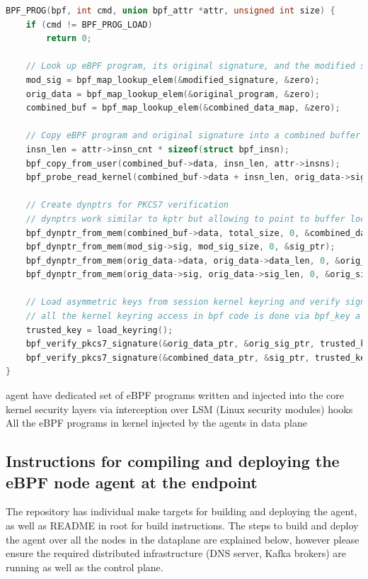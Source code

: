 \documentclass [11pt, proquest] {uwthesis}[2020/02/24]
\begin{document}
\begin{lstlisting}[language=C, caption={Kernel BPF LSM Hook for PKCS7 Signature Verification}, label={lst:bpf-lsm}]
BPF_PROG(bpf, int cmd, union bpf_attr *attr, unsigned int size) {
    if (cmd != BPF_PROG_LOAD)
        return 0;

    // Look up eBPF program, its original signature, and the modified signature
    mod_sig = bpf_map_lookup_elem(&modified_signature, &zero);
    orig_data = bpf_map_lookup_elem(&original_program, &zero);
    combined_buf = bpf_map_lookup_elem(&combined_data_map, &zero);

    // Copy eBPF program and original signature into a combined buffer
    insn_len = attr->insn_cnt * sizeof(struct bpf_insn);
    bpf_copy_from_user(combined_buf->data, insn_len, attr->insns);
    bpf_probe_read_kernel(combined_buf->data + insn_len, orig_data->sig_len, orig_data->sig);

    // Create dynptrs for PKCS7 verification
    // dynptrs work similar to kptr but allowing to point to buffer location storing large amount of data as in case of signature for eBPF verifier requirements. 
    bpf_dynptr_from_mem(combined_buf->data, total_size, 0, &combined_data_ptr);
    bpf_dynptr_from_mem(mod_sig->sig, mod_sig_size, 0, &sig_ptr);
    bpf_dynptr_from_mem(orig_data->data, orig_data->data_len, 0, &orig_data_ptr);
    bpf_dynptr_from_mem(orig_data->sig, orig_data->sig_len, 0, &orig_sig_ptr);

    // Load asymmetric keys from session kernel keyring and verify signatures
    // all the kernel keyring access in bpf code is done via bpf_key a wrapper over kernel core key structure accessed from userspace via keyctl
    trusted_key = load_keyring();
    bpf_verify_pkcs7_signature(&orig_data_ptr, &orig_sig_ptr, trusted_key);
    bpf_verify_pkcs7_signature(&combined_data_ptr, &sig_ptr, trusted_key);
}
\end{lstlisting}

agent have dedicated set of eBPF programs written and injected into the core kernel security layers via interception over LSM (Linux security modules) hooks
All the eBPF programs in kernel injected by the agents in data plane 



\subsection{Instructions for compiling and deploying the eBPF node agent at the endpoint}
The repository has individual make targets for building and deploying the agent, as well as README in root for build instructions. The steps to build and deploy the agent over all the nodes in the dataplane are explained below, however please ensure the required distributed infrastructure (DNS server, Kafka brokers) are running as well as the control plane. 
\end{document}

